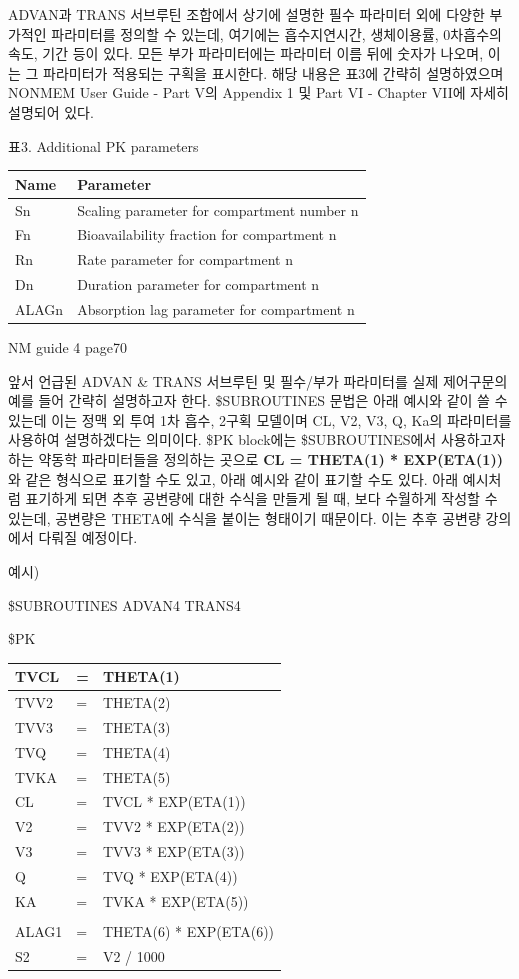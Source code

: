 \documentclass[
  10pt,
]{krantz}
\begin{document}
ADVAN과 TRANS 서브루틴 조합에서 상기에 설명한 필수 파라미터 외에 다양한 부가적인 파라미터를 정의할 수 있는데, 여기에는
흡수지연시간, 생체이용률, 0차흡수의 속도, 기간 등이 있다. 모든 부가 파라미터에는 파라미터 이름 뒤에 숫자가 나오며, 이는 그
파라미터가 적용되는 구획을 표시한다. 해당 내용은 표3에 간략히 설명하였으며 NONMEM User Guide - Part V의
Appendix 1 및 Part VI - Chapter VII에 자세히 설명되어 있다.

표3. Additional PK parameters

\begin{longtable}[]{@{}ll@{}}
\toprule
\textbf{Name} & \textbf{Parameter}\tabularnewline
\midrule
\endhead
Sn & Scaling parameter for compartment number n\tabularnewline
Fn & Bioavailability fraction for compartment n\tabularnewline
Rn & Rate parameter for compartment n\tabularnewline
Dn & Duration parameter for compartment n\tabularnewline
ALAGn & Absorption lag parameter for compartment n\tabularnewline
\bottomrule
\end{longtable}

NM guide 4 page70

앞서 언급된 ADVAN \& TRANS 서브루틴 및 필수/부가 파라미터를 실제 제어구문의 예를 들어 간략히 설명하고자 한다.
\$SUBROUTINES 문법은 아래 예시와 같이 쓸 수 있는데 이는 정맥 외 투여 1차 흡수, 2구획 모델이며 CL, V2,
V3, Q, Ka의 파라미터를 사용하여 설명하겠다는 의미이다. \$PK block에는 \$SUBROUTINES에서 사용하고자 하는
약동학 파라미터들을 정의하는 곳으로 \textbf{CL = THETA(1) * EXP(ETA(1))} 와 같은 형식으로 표기할
수도 있고, 아래 예시와 같이 표기할 수도 있다. 아래 예시처럼 표기하게 되면 추후 공변량에 대한 수식을 만들게 될 때,
보다 수월하게 작성할 수 있는데, 공변량은 THETA에 수식을 붙이는 형태이기 때문이다. 이는 추후 공변량 강의에서 다뤄질
예정이다.

예시)

\$SUBROUTINES ADVAN4 TRANS4

\$PK

\begin{longtable}[]{@{}lll@{}}
\toprule
TVCL & = & THETA(1)\tabularnewline
\midrule
\endhead
TVV2 & = & THETA(2)\tabularnewline
TVV3 & = & THETA(3)\tabularnewline
TVQ & = & THETA(4)\tabularnewline
TVKA & = & THETA(5)\tabularnewline
CL & = & TVCL * EXP(ETA(1))\tabularnewline
V2 & = & TVV2 * EXP(ETA(2))\tabularnewline
V3 & = & TVV3 * EXP(ETA(3))\tabularnewline
Q & = & TVQ * EXP(ETA(4))\tabularnewline
KA & = & TVKA * EXP(ETA(5))\tabularnewline
& &\tabularnewline
ALAG1 & = & THETA(6) * EXP(ETA(6))\tabularnewline
S2 & = & V2 / 1000\tabularnewline
\bottomrule
\end{longtable}
\end{document}
